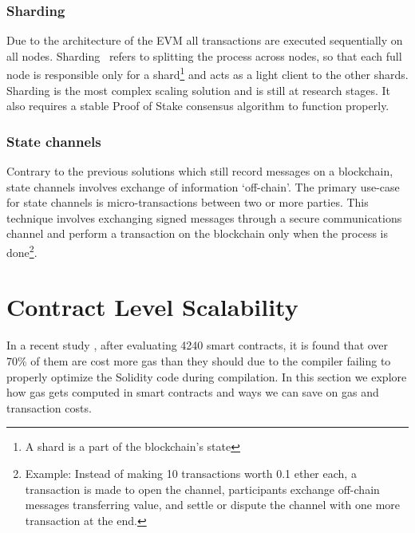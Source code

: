 \subsubsection*{Sharding}
Due to the architecture of the EVM all transactions are executed sequentially on all nodes. Sharding~\cite{sharding} refers to splitting the process across nodes, so that each full node is responsible only for a shard\footnote{A shard is a part of the blockchain's state} and acts as a light client to the other shards. Sharding is the most complex scaling solution and is still at research stages. It also requires a stable Proof of Stake consensus algorithm to function properly.

\subsubsection*{State channels}
Contrary to the previous solutions which still record messages on a blockchain, state channels involves exchange of information `off-chain'. The primary use-case for state channels is micro-transactions between two or more parties. This technique involves exchanging signed messages through a secure communications channel and perform a transaction on the blockchain only when the process is done\footnote{Example: Instead of making 10 transactions worth 0.1 ether each, a transaction is made to open the channel, participants exchange off-chain messages transferring value, and settle or dispute the channel with one more transaction at the end.}.

\section{Contract Level Scalability}
In a recent study \cite{DBLP:journals/corr/ChenLLZ17}, after evaluating 4240 smart contracts, it is found that over 70\% of them are cost more gas than they should due to the compiler failing to properly optimize the Solidity code during compilation. In this section we explore how gas gets computed in smart contracts and ways we can save on gas and transaction costs.

